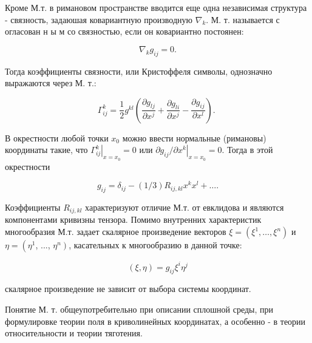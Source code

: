 \documentclass[10pt]{article}
\begin{document}
Кроме М.т. в римановом пространстве вводится еще одна независимая структура - связность, задаюшая ковариантную производную $\nabla_{k}$. М. т. называется с огласован н ы м со связностью, если он ковариантно постоянен:



\[

\nabla_{k} g_{i j}=0 .

\]



Тогда коэффициенты связности, или Кристоффеля символы, однозначно выражаются через М. т.:



\[

\Gamma_{i j}^{k}=\frac{1}{2} g^{k l}\left(\frac{\partial g_{l j}}{\partial x^{j}}+\frac{\partial g_{l i}}{\partial x^{j}}-\frac{\partial g_{i j}}{\partial x^{l}}\right) \text {. }

\]



В окрестности любой точки $x_{0}$ можно ввести нормальные (римановы) координаты такие, что $\left.\Gamma_{i j}^{k}\right|_{x=x_{0}}=0$ или $\partial g_{i j} /\left.\partial x^{k}\right|_{x=x_{0}}=0$. Тогда в этой окрестности



\[

g_{i j}=\delta_{i j}-(1 / 3) R_{i j, k l} x^{k} x^{l}+\ldots .

\]



Коэффициенты $R_{i j, k l}$ характеризуют отличие М.т. от евклидова и являются компонентами кривизны тензора. Помимо внутренних характеристик многообразия М.т. задает скалярное произведение векторов $\xi=\left(\xi^{1}, \ldots, \xi^{n}\right)$ и $\eta=\left(\eta^{1}\right.$, ..., $\left.\eta^{n}\right)$, касательных к многообразию в данной точке:



\[

(\xi, \eta)=g_{i j} \xi^{i} \eta^{j}

\]



скалярное произведение не зависит от выбора системы координат.



Понятие М. т. общеупотребительно при описании сплошной среды, при формулировке теории поля в криволинейных координатах, а особенно - в теории относительности и теории тяготения.
\end{document}
